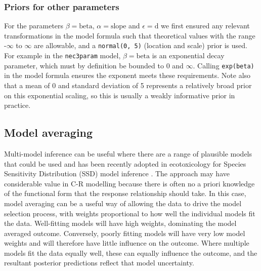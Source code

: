 \documentclass[
  shortnames]{jss}
\begin{document}
\hypertarget{priors-for-other-parameters}{%
\subsubsection{Priors for other parameters}\label{priors-for-other-parameters}}

For the parameters \(\beta = \text{beta}\), \(\alpha = \text{slope}\) and \(\epsilon = \text{d}\) we first ensured any relevant transformations in the model formula such that theoretical values with the range -\(\infty\) to \(\infty\) are allowable, and a \texttt{normal(0,\ 5)} (location and scale) prior is used. For example in the \texttt{nec3param} model, \(\beta = \text{beta}\) is an exponential decay parameter, which must by definition be bounded to 0 and \(\infty\). Calling \texttt{exp(beta)} in the model formula ensures the exponent meets these requirements. Note also that a mean of 0 and standard deviation of 5 represents a relatively broad prior on this exponential scaling, so this is usually a weakly informative prior in practice.

\subsection[Model averaging]{Model averaging}\label{modavg}

Multi-model inference can be useful where there are a range of plausible models that could be used \citep{Burnham2002} and has been recently adopted in ecotoxicology for Species Sensitivity Distribution (SSD) model inference \citep{Thorley2018, fox2020, Dalgarno}. The approach may have considerable value in C-R modelling because there is often no a priori knowledge of the functional form that the response relationship should take. In this case, model averaging can be a useful way of allowing the data to drive the model selection process, with weights proportional to how well the individual models fit the data. Well-fitting models will have high weights, dominating the model averaged outcome. Conversely, poorly fitting models will have very low model weights and will therefore have little influence on the outcome. Where multiple models fit the data equally well, these can equally influence the outcome, and the resultant posterior predictions reflect that model uncertainty.
\end{document}
